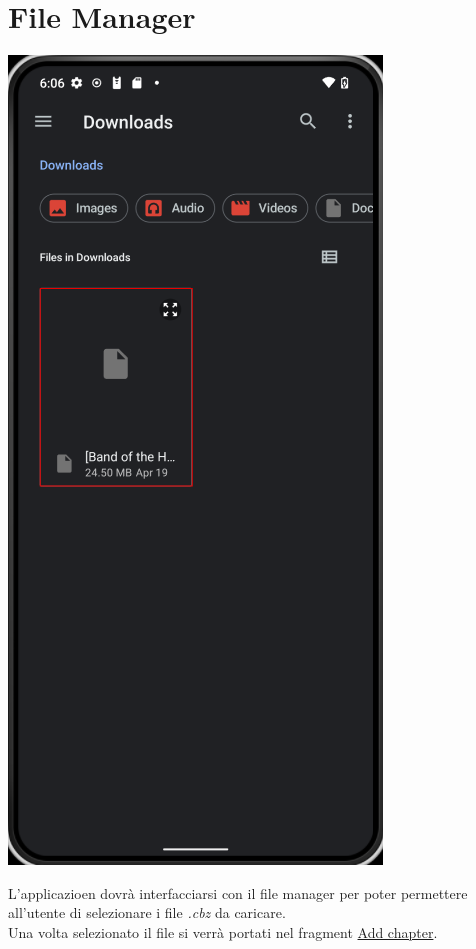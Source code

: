 \documentclass{report}
\begin{document}
\section{File Manager}

\begin{center}
  \includegraphics[scale=0.4]{file_manager.png}
\end{center}

L'applicazioen dovrà interfacciarsi con il file manager per poter permettere all'utente di selezionare i file \emph{.cbz} da caricare.\\
Una volta selezionato il file si verrà portati nel fragment \hyperref[sec:add_chapter]{Add chapter}.
\end{document}

